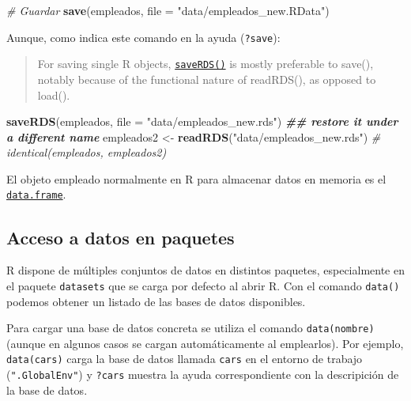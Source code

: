 \documentclass[
]{book}
\newenvironment{Shaded}{\begin{snugshade}}{\end{snugshade}}
\newcommand{\AttributeTok}[1]{\textcolor[rgb]{0.13,0.29,0.53}{#1}}
\newcommand{\CommentTok}[1]{\textcolor[rgb]{0.56,0.35,0.01}{\textit{#1}}}
\newcommand{\DocumentationTok}[1]{\textcolor[rgb]{0.56,0.35,0.01}{\textbf{\textit{#1}}}}
\newcommand{\FunctionTok}[1]{\textcolor[rgb]{0.13,0.29,0.53}{\textbf{#1}}}
\newcommand{\NormalTok}[1]{#1}
\newcommand{\OtherTok}[1]{\textcolor[rgb]{0.56,0.35,0.01}{#1}}
\newcommand{\StringTok}[1]{\textcolor[rgb]{0.31,0.60,0.02}{#1}}
\begin{document}
\begin{Shaded}
\begin{Highlighting}[]
\CommentTok{\# Guardar}
\FunctionTok{save}\NormalTok{(empleados, }\AttributeTok{file =} \StringTok{"data/empleados\_new.RData"}\NormalTok{)}
\end{Highlighting}
\end{Shaded}

Aunque, como indica este comando en la ayuda (\texttt{?save}):

\begin{quote}
For saving single R objects, \href{https://www.rdocumentation.org/packages/base/versions/3.6.1/topics/saveRDS}{\texttt{saveRDS()}}
is mostly preferable to save(),
notably because of the functional nature of readRDS(), as opposed to load().
\end{quote}

\begin{Shaded}
\begin{Highlighting}[]
\FunctionTok{saveRDS}\NormalTok{(empleados, }\AttributeTok{file =} \StringTok{"data/empleados\_new.rds"}\NormalTok{)}
\DocumentationTok{\#\# restore it under a different name}
\NormalTok{empleados2 }\OtherTok{\textless{}{-}} \FunctionTok{readRDS}\NormalTok{(}\StringTok{"data/empleados\_new.rds"}\NormalTok{)}
\CommentTok{\# identical(empleados, empleados2)}
\end{Highlighting}
\end{Shaded}

El objeto empleado normalmente en R para almacenar datos en memoria
es el \href{https://www.rdocumentation.org/packages/base/versions/3.6.1/topics/data.frame}{\texttt{data.frame}}.

\subsection{Acceso a datos en paquetes}\label{acceso-a-datos-en-paquetes}

R dispone de múltiples conjuntos de datos en distintos paquetes, especialmente en el paquete \texttt{datasets}
que se carga por defecto al abrir R.
Con el comando \texttt{data()} podemos obtener un listado de las bases de datos disponibles.

Para cargar una base de datos concreta se utiliza el comando
\texttt{data(nombre)} (aunque en algunos casos se cargan automáticamente al emplearlos).
Por ejemplo, \texttt{data(cars)} carga la base de datos llamada \texttt{cars} en el entorno de trabajo (\texttt{".GlobalEnv"})
y \texttt{?cars} muestra la ayuda correspondiente con la descripición de la base de datos.
\end{document}
